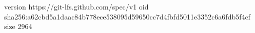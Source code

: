version https://git-lfs.github.com/spec/v1
oid sha256:a62cbd5a1daac84b778ece538095d59650cc7d4fbfd5011e3352c6a6fdb5f4cf
size 2964
